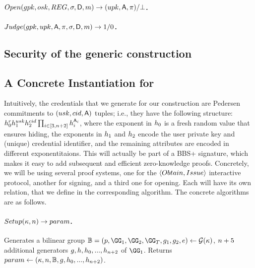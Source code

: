 \paragraph{$\Open(\gpk,\osk,\trans,\sig,\DAttrs,\msg)
  \rightarrow (\upk,\Attrs,\oproof)/\bot$.} %

\paragraph{$Judge(gpk,upk,\mathsf{A},\pi,\sigma,\mathsf{D},m)
  \rightarrow 1/0$.} %

\subsection{Security of the generic \GSAC construction}
\label{ssec:gsac-const-sec}


\subsection{A Concrete Instantiation for \GSAC}
\label{ssec:instantiation-gsac}

Intuitively, the credentials that we generate for our \GSAC construction are
Pedersen commitments to $(usk,cid,\mathsf{A})$ tuples; i.e., they have
the following structure: $h_0^rh_1^{usk}h_2^{cid}
\prod_{i \in [3,n+2]}h_i^{\mathsf{A}_i}$, where the exponent in
$h_0$ is a fresh random value that ensures hiding, the exponents in
$h_1$ and $h_2$ encode the user private key and (unique) credential
identifier, and the remaining attributes are encoded in different
exponentitaions. This will actually be part of a BBS+ signature, which makes it
easy to add subsequent and efficient zero-knowledge proofs. Concretely, we will
be using several \NIZK proof systems, one for the $\langle Obtain,Issue
\rangle$ interactive protocol, another for signing, and a third one for opening.
Each will have its own relation, that we define in the corresponding algorithm.
The concrete algorithms are as follows.

\paragraph{$Setup(\kappa,n) \rightarrow param$.} %
Generates a bilinear group $\BB = (p,\GG_1,\GG_2,\GG_T,\gen{g}_1,\gen{g}_2,e) \gets
\PGen(\secpar)$, $n+5$ additional generators $g,h,h_0,...,
h_{n+2}$ of $\GG_1$. Returns $param \gets
(\kappa,n,\mathbb{B},g,h_0,...,h_{n+2})$.

